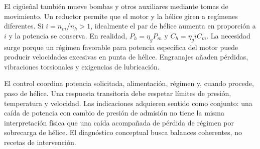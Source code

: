 El cigüeñal también mueve bombas y otros auxiliares mediante tomas de movimiento. Un reductor permite que el motor y la hélice giren a regímenes diferentes. Si $i=n_m/n_h>1$, idealmente el par de hélice aumenta en proporción a $i$ y la potencia se conserva. En realidad, $P_h=\eta_gP_m$ y $C_h=\eta_g i C_m$. La necesidad surge porque un régimen favorable para potencia específica del motor puede producir velocidades excesivas en punta de hélice. Engranajes añaden pérdidas, vibraciones torsionales y exigencias de lubricación.

El control coordina potencia solicitada, alimentación, régimen y, cuando procede, paso de hélice. Una respuesta transitoria debe respetar límites de presión, temperatura y velocidad. Las indicaciones adquieren sentido como conjunto: una caída de potencia con cambio de presión de admisión no tiene la misma interpretación física que una caída acompañada de pérdida de régimen por sobrecarga de hélice. El diagnóstico conceptual busca balances coherentes, no recetas de intervención.

